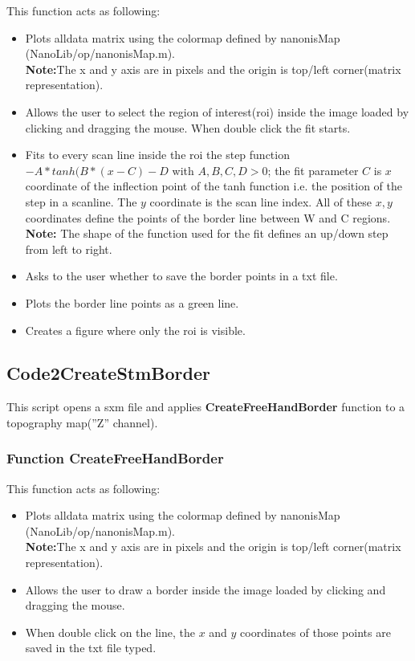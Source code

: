 This function acts as following:
\begin{itemize}  
\item Plots alldata matrix using the colormap defined by nanonisMap (NanoLib/op/nanonisMap.m).\\
\textbf{Note:}The x and y axis are in pixels and the origin is top/left corner(matrix representation).
\item Allows the user to select the region of interest(roi) inside the image loaded by clicking 
and dragging the mouse. When double click the fit starts.
\item Fits to every scan line inside the roi the step function \textit{$-A*tanh(B*(x-C)-D$} with $A,B,C,D>0$; 
the fit parameter $C$ is $x$ coordinate of the inflection point of the tanh function
i.e. the position of the step in a scanline. The $y$ coordinate is the scan line index.
All of these $x,y$ coordinates define the points of the border line between W and C regions.\\
\textbf{Note:} The shape of the function used for the fit defines an up/down step from left to right.
\item Asks to the user whether to save the border points in a txt file.
\item Plots the border line points as a  green line.
\item Creates a figure where only the roi is visible.
\end{itemize}

\subsection{Code2CreateStmBorder}

This script opens a sxm file and applies \textbf{CreateFreeHandBorder} function to a topography map(''Z'' channel).

\subsubsection{Function CreateFreeHandBorder}

This function acts as following:
\begin{itemize}  
\item Plots alldata matrix using the colormap defined by nanonisMap (NanoLib/op/nanonisMap.m).\\
\textbf{Note:}The x and y axis are in pixels and the origin is top/left corner(matrix representation).
\item Allows the user to draw a border inside the image loaded by clicking and dragging the mouse.
\item When double click on the line, the $x$ and $y$ coordinates of those points are saved in the txt file typed.
\end{itemize}

